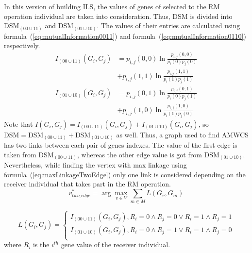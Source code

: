 In this version of building ILS, the values of genes of selected to the RM operation individual are taken into consideration. Thus, DSM is divided into DSM$_{(00 \cup 11)}$ and DSM$_{(01 \cup 10)}$. The values of their entries are calculated using formula~(\ref{eq:mutualInformation0011}) and formula~(\ref{eq:mutualInformation0110}) respectively.
\begin{equation}
	\label{eq:mutualInformation0011}
	\begin{aligned}
		I_{(00 \cup 11)}(G_i, G_j) &= p_{i,j}(0, 0) \ln{\frac{p_{i,j}(0,0)}{p_i(0)p_j(0)}} 
		\\& + p_{i,j}(1, 1) \ln{\frac{p_{i,j}(1,1)}{p_i(1)p_j(1)}}
	\end{aligned}
\end{equation}
\begin{equation}
	\label{eq:mutualInformation0110}
	\begin{aligned}
		I_{(01 \cup 10)}(G_i, G_j) &= p_{i,j}(0, 1) \ln{\frac{p_{i,j}(0,1)}{p_i(0)p_j(1)}} 
		\\& + p_{i,j}(1, 0) \ln{\frac{p_{i,j}(1,0)}{p_i(1)p_j(0)}}
	\end{aligned}
\end{equation}
Note that $I(G_i, G_j) = I_{(00 \cup 11)}(G_i, G_j) + I_{(01 \cup 10)}(G_i, G_j)$, so $\text{DSM} = \text{DSM}_{(00 \cup 11)} + \text{DSM}_{(01 \cup 10)}$ as well. Thus, a graph used to find AMWCS has two links between each pair of genes indexes. The value of the first edge is taken from DSM$_{(00 \cup 11)}$, whereas the other edge value is got from DSM$_{(01 \cup 10)}$. Nevertheless, while finding the vertex with max linkage using formula~(\ref{eq:maxLinkageTwoEdge}) only one link is considered depending on the receiver individual that takes part in the RM operation.
\begin{equation}
	\label{eq:maxLinkageTwoEdge}
	v^*_{two\_edge} = \arg \max_{v \in V} \sum_{m \in M} L(G_v, G_m)
\end{equation}

\begin{equation}
	L(G_i, G_j) = 
	\begin{cases}
		I_{(00 \cup 11)}(G_i, G_j), R_i = 0 \land R_j = 0 \lor R_i = 1 \land R_j = 1\\
		I_{(01 \cup 10)}(G_i, G_j), R_i = 0 \land R_j = 1 \lor R_i = 1 \land R_j = 0\\
	\end{cases}
\end{equation}
where $R_i$ is the $i^{th}$ gene value of the receiver individual.

